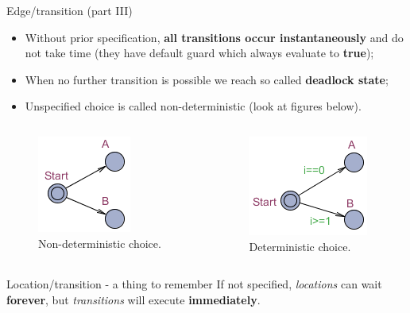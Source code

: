 \documentclass{beamer}
\begin{document}
\begin{frame}{Edge/transition (part III)}
	\vspace{-2mm}
	\begin{itemize}
		\item Without prior specification, \textbf{all transitions occur instantaneously} and do not take time (they have default guard which always evaluate to \textbf{true});
		\item When no further transition is possible we reach so called \textbf{deadlock state};
		\item Unspecified choice is called non-deterministic (look at figures below).
	\end{itemize}
	\vspace{-7mm}	
	\begin{columns}
		\begin{column}{.5\textwidth}
			\begin{figure}[H]
				\label{img:ndc}
				\includegraphics[scale=0.7]{img/uppaal_non_deterministic_choice.png}
				\caption{Non-deterministic choice.}
			\end{figure}
		\end{column}
		\begin{column}{.5\textwidth}
			\begin{figure}[H]
				\label{img:dc}
				\includegraphics[scale=0.7]{img/uppaal_deterministic_choice.png}
				\caption{Deterministic choice.}
			\end{figure}
		\end{column}		
	\end{columns}
\end{frame}

\begin{frame}{Location/transition - a thing to remember}
	If not specified, \textit{locations} can wait \textbf{forever}, but \textit{transitions} will execute \textbf{immediately}.
\end{frame}
\end{document}
